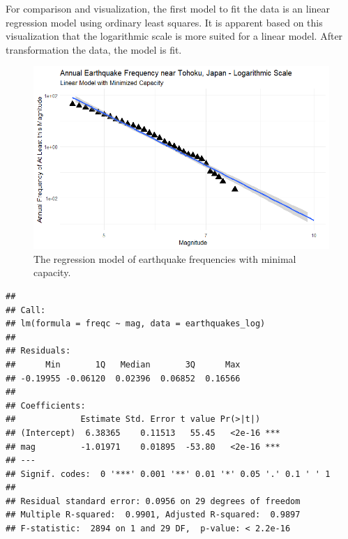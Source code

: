 For comparison and visualization, the first model to fit the data is an linear regression model using ordinary least squares.  It is apparent based on this visualization that the logarithmic scale is more suited for a linear model.  After transformation the data, the model is fit.

\begin{figure}[H]
    \center
    \includegraphics[width=0.65\linewidth]{Figures/tohoku_logscale_fit.png}
    \caption{\footnotesize{The regression model of earthquake frequencies with minimal capacity.}}
    \label{tohoku_lm}
\end{figure}

\begin{verbatim}
## 
## Call:
## lm(formula = freqc ~ mag, data = earthquakes_log)
## 
## Residuals:
##      Min       1Q   Median       3Q      Max 
## -0.19955 -0.06120  0.02396  0.06852  0.16566 
## 
## Coefficients:
##             Estimate Std. Error t value Pr(>|t|)    
## (Intercept)  6.38365    0.11513   55.45   <2e-16 ***
## mag         -1.01971    0.01895  -53.80   <2e-16 ***
## ---
## Signif. codes:  0 '***' 0.001 '**' 0.01 '*' 0.05 '.' 0.1 ' ' 1
## 
## Residual standard error: 0.0956 on 29 degrees of freedom
## Multiple R-squared:  0.9901, Adjusted R-squared:  0.9897 
## F-statistic:  2894 on 1 and 29 DF,  p-value: < 2.2e-16
\end{verbatim}


